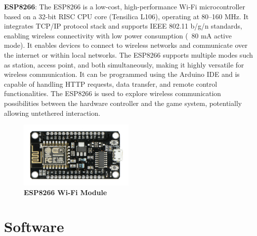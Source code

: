 \textbf{ESP8266}: The ESP8266 is a low-cost, high-performance Wi-Fi microcontroller based on a 32-bit RISC CPU core (Tensilica L106), operating at 80–160 MHz. It integrates TCP/IP protocol stack and supports IEEE 802.11 b/g/n standards, enabling wireless connectivity with low power consumption (~80 mA active mode). It enables devices to connect to wireless networks and communicate over the internet or within local networks. The ESP8266 supports multiple modes such as station, access point, and both simultaneously, making it highly versatile for wireless communication. It can be programmed using the Arduino IDE and is capable of handling HTTP requests, data transfer, and remote control functionalities. The ESP8266 is used to explore wireless communication possibilities between the hardware controller and the game system, potentially allowing untethered interaction.

\begin{figure}[htbp!]
\centering
\includegraphics[width=0.5\textwidth]{images/fig3.2.jpg}
\caption{\textbf{ESP8266 Wi-Fi Module}}
\label{fig:3.2}
\end{figure}

\section{Software}
\lipsum[4-8]
